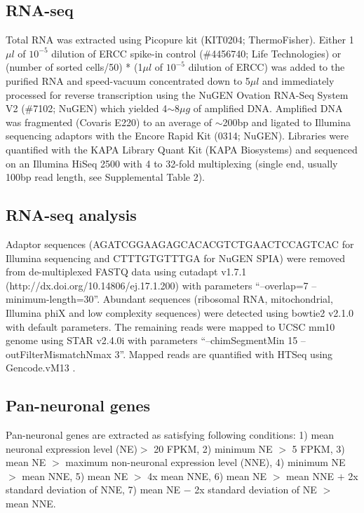 \subsection{RNA-seq}
Total RNA was extracted using Picopure kit (KIT0204; ThermoFisher). Either 1$\mu l$ of $10^{-5}$ dilution of ERCC spike-in control (\#4456740; Life Technologies) or (number of sorted cells/50) * (1$\mu l$ of $10^{-5}$ dilution of ERCC) was added to the purified RNA and speed-vacuum concentrated down to 5$\mu l$ and immediately processed for reverse transcription using the NuGEN Ovation RNA-Seq System V2 (\#7102; NuGEN) which yielded 4$\sim$8$\mu g$ of amplified DNA. Amplified DNA was fragmented (Covaris E220) to an average of $\sim$200bp and ligated to Illumina sequencing adaptors with the Encore Rapid Kit (0314; NuGEN). Libraries were quantified with the KAPA Library Quant Kit (KAPA Biosystems) and sequenced on an Illumina HiSeq 2500 with 4 to 32-fold multiplexing (single end, usually 100bp read length, see Supplemental Table 2).

\subsection{RNA-seq analysis}
Adaptor sequences (AGATCGGAAGAGCACACGTCTGAACTCCAGTCAC for Illumina sequencing and CTTTGTGTTTGA for NuGEN SPIA) were removed from de-multiplexed FASTQ data using cutadapt v1.7.1 (http://dx.doi.org/10.14806/ej.17.1.200) with parameters “--overlap=7 --minimum-length=30”. Abundant sequences (ribosomal RNA, mitochondrial, Illumina phiX and low complexity sequences) were detected using bowtie2 \citep{Langmead_2012} v2.1.0 with default parameters. The remaining reads were mapped to UCSC mm10 genome using STAR \citep{Dobin_2012} v2.4.0i with parameters “--chimSegmentMin 15 --outFilterMismatchNmax 3”. Mapped reads are quantified with HTSeq \citep{Anders_2014} using Gencode.vM13 \citep{Harrow_2012}.

\subsection{Pan-neuronal genes}
Pan-neuronal genes are extracted as satisfying following conditions: 1) mean neuronal expression level (NE)$>$ 20 FPKM, 2) minimum NE $>$ 5 FPKM, 3) mean NE $>$ maximum non-neuronal expression level (NNE), 4) minimum NE $>$ mean NNE, 5) mean NE $>$ 4x mean NNE, 6) mean NE $>$ mean NNE $+$ 2x standard deviation of NNE, 7) mean NE $-$ 2x standard deviation of NE $>$ mean NNE. 

